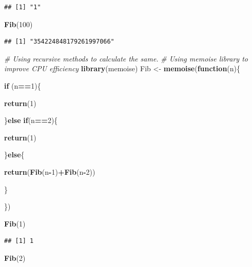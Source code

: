 \documentclass[]{article}
\newenvironment{Shaded}{\begin{snugshade}}{\end{snugshade}}
\newcommand{\KeywordTok}[1]{\textcolor[rgb]{0.13,0.29,0.53}{\textbf{#1}}}
\newcommand{\DecValTok}[1]{\textcolor[rgb]{0.00,0.00,0.81}{#1}}
\newcommand{\StringTok}[1]{\textcolor[rgb]{0.31,0.60,0.02}{#1}}
\newcommand{\CommentTok}[1]{\textcolor[rgb]{0.56,0.35,0.01}{\textit{#1}}}
\newcommand{\ControlFlowTok}[1]{\textcolor[rgb]{0.13,0.29,0.53}{\textbf{#1}}}
\newcommand{\OperatorTok}[1]{\textcolor[rgb]{0.81,0.36,0.00}{\textbf{#1}}}
\newcommand{\NormalTok}[1]{#1}
\begin{document}
\begin{verbatim}
## [1] "1"
\end{verbatim}

\begin{Shaded}
\begin{Highlighting}[]
\KeywordTok{Fib}\NormalTok{(}\DecValTok{100}\NormalTok{)}
\end{Highlighting}
\end{Shaded}

\begin{verbatim}
## [1] "354224848179261997066"
\end{verbatim}

\begin{Shaded}
\begin{Highlighting}[]
\CommentTok{# Using recursive methods to calculate the same.}
\CommentTok{# Using memoise library to improve CPU efficiency}
\KeywordTok{library}\NormalTok{(memoise)}
\NormalTok{Fib <-}\StringTok{ }\KeywordTok{memoise}\NormalTok{(}\ControlFlowTok{function}\NormalTok{(n)\{}
  
  
  
  \ControlFlowTok{if}\NormalTok{ (n}\OperatorTok{==}\DecValTok{1}\NormalTok{)\{}
    
    \KeywordTok{return}\NormalTok{(}\DecValTok{1}\NormalTok{)}
    
\NormalTok{  \}}\ControlFlowTok{else} \ControlFlowTok{if}\NormalTok{(n}\OperatorTok{==}\DecValTok{2}\NormalTok{)\{}
    
    \KeywordTok{return}\NormalTok{(}\DecValTok{1}\NormalTok{)}
    
\NormalTok{  \}}\ControlFlowTok{else}\NormalTok{\{}
  
    \KeywordTok{return}\NormalTok{(}\KeywordTok{Fib}\NormalTok{(n}\OperatorTok{-}\DecValTok{1}\NormalTok{)}\OperatorTok{+}\KeywordTok{Fib}\NormalTok{(n}\OperatorTok{-}\DecValTok{2}\NormalTok{))}

\NormalTok{  \}}

  
\NormalTok{\})}

\KeywordTok{Fib}\NormalTok{(}\DecValTok{1}\NormalTok{)}
\end{Highlighting}
\end{Shaded}

\begin{verbatim}
## [1] 1
\end{verbatim}

\begin{Shaded}
\begin{Highlighting}[]
\KeywordTok{Fib}\NormalTok{(}\DecValTok{2}\NormalTok{)}
\end{Highlighting}
\end{Shaded}
\end{document}

